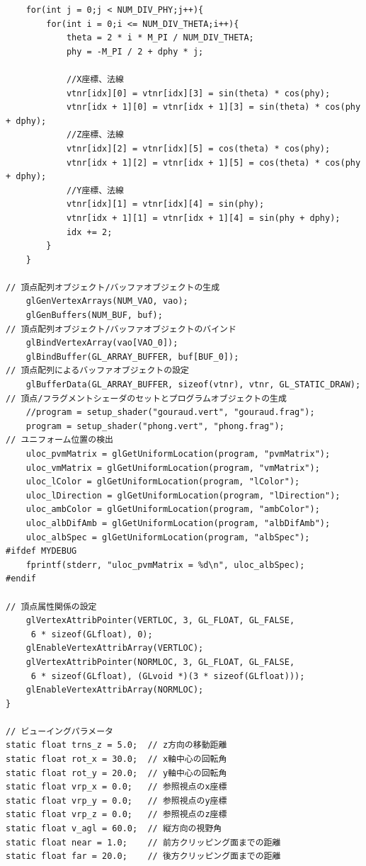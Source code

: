 \documentclass[12pt]{jreport}
\begin{document}
\begin{verbatim}
    for(int j = 0;j < NUM_DIV_PHY;j++){
        for(int i = 0;i <= NUM_DIV_THETA;i++){
            theta = 2 * i * M_PI / NUM_DIV_THETA;
            phy = -M_PI / 2 + dphy * j;

            //X座標、法線
            vtnr[idx][0] = vtnr[idx][3] = sin(theta) * cos(phy);
            vtnr[idx + 1][0] = vtnr[idx + 1][3] = sin(theta) * cos(phy + dphy);
            //Z座標、法線
            vtnr[idx][2] = vtnr[idx][5] = cos(theta) * cos(phy);
            vtnr[idx + 1][2] = vtnr[idx + 1][5] = cos(theta) * cos(phy + dphy);
            //Y座標、法線
            vtnr[idx][1] = vtnr[idx][4] = sin(phy);
            vtnr[idx + 1][1] = vtnr[idx + 1][4] = sin(phy + dphy);
            idx += 2;
        }
    }

// 頂点配列オブジェクト/バッファオブジェクトの生成
    glGenVertexArrays(NUM_VAO, vao);
    glGenBuffers(NUM_BUF, buf);
// 頂点配列オブジェクト/バッファオブジェクトのバインド
    glBindVertexArray(vao[VAO_0]);
    glBindBuffer(GL_ARRAY_BUFFER, buf[BUF_0]);
// 頂点配列によるバッファオブジェクトの設定
    glBufferData(GL_ARRAY_BUFFER, sizeof(vtnr), vtnr, GL_STATIC_DRAW);
// 頂点/フラグメントシェーダのセットとプログラムオブジェクトの生成
    //program = setup_shader("gouraud.vert", "gouraud.frag");
	program = setup_shader("phong.vert", "phong.frag");
// ユニフォーム位置の検出
    uloc_pvmMatrix = glGetUniformLocation(program, "pvmMatrix");
    uloc_vmMatrix = glGetUniformLocation(program, "vmMatrix");
    uloc_lColor = glGetUniformLocation(program, "lColor");
    uloc_lDirection = glGetUniformLocation(program, "lDirection");
    uloc_ambColor = glGetUniformLocation(program, "ambColor");
    uloc_albDifAmb = glGetUniformLocation(program, "albDifAmb");
    uloc_albSpec = glGetUniformLocation(program, "albSpec");
#ifdef MYDEBUG
    fprintf(stderr, "uloc_pvmMatrix = %d\n", uloc_albSpec);
#endif

// 頂点属性関係の設定
    glVertexAttribPointer(VERTLOC, 3, GL_FLOAT, GL_FALSE,
     6 * sizeof(GLfloat), 0);
    glEnableVertexAttribArray(VERTLOC);
    glVertexAttribPointer(NORMLOC, 3, GL_FLOAT, GL_FALSE,
     6 * sizeof(GLfloat), (GLvoid *)(3 * sizeof(GLfloat)));
    glEnableVertexAttribArray(NORMLOC);
}

// ビューイングパラメータ
static float trns_z = 5.0;	// z方向の移動距離
static float rot_x = 30.0;	// x軸中心の回転角
static float rot_y = 20.0;	// y軸中心の回転角
static float vrp_x = 0.0;	// 参照視点のx座標
static float vrp_y = 0.0;	// 参照視点のy座標
static float vrp_z = 0.0;	// 参照視点のz座標
static float v_agl = 60.0;	// 縦方向の視野角
static float near = 1.0;	// 前方クリッピング面までの距離
static float far = 20.0;	// 後方クリッピング面までの距離


\end{verbatim}
\end{document}
